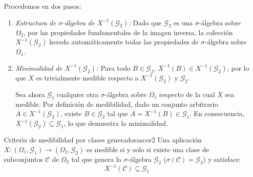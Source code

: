 \begin{demostracion}
Procedemos en dos pasos:
\begin{enumerate}[label=\arabic*.]
    \item \textit{Estructura de $\sigma$-álgebra de $X^{-1}(\mathcal{G}_2)$:}
    Dado que $\mathcal{G}_2$ es una $\sigma$-álgebra sobre $\Omega_2$, por las propiedades fundamentales de la imagen inversa, la colección $X^{-1}(\mathcal{G}_2)$ hereda automáticamente todas las propiedades de $\sigma$-álgebra sobre $\Omega_1$.
    
    \item \textit{Minimalidad de $X^{-1}(\mathcal{G}_2)$:}
    Para todo $B \in \mathcal{G}_2$, $X^{-1}(B) \in X^{-1}(\mathcal{G}_2)$, por lo que $X$ es trivialmente medible respecto a $X^{-1}(\mathcal{G}_2)$ y $\mathcal{G}_2$.
    
    Sea ahora $\mathcal{G}_1$ cualquier otra $\sigma$-álgebra sobre $\Omega_1$ respecto de la cual $X$ sea medible. Por definición de medibilidad, dado un conjunto arbitrario $A \in X^{-1}(\mathcal{G}_2)$, existe $B \in \mathcal{G}_2$ tal que $A = X^{-1}(B) \in \mathcal{G}_1$. En consecuencia, $X^{-1}(\mathcal{G}_2) \subseteq \mathcal{G}_1$, lo que demuestra la minimalidad.
\end{enumerate}
\end{demostracion}

\begin{corolario}{Criterio de medibilidad por clases generadoras}{cor2}
Una aplicación $X : (\Omega_1, \mathcal{G}_1) \to (\Omega_2, \mathcal{G}_2)$ es medible si y solo si existe una clase de subconjuntos $\mathcal{C}$ de $\Omega_2$ tal que genera la $\sigma$-álgebra $\mathcal{G}_2$ ($\sigma(\mathcal{C}) = \mathcal{G}_2$) y satisface:
\[
    X^{-1}(\mathcal{C}) \subseteq \mathcal{G}_1
\]
\end{corolario}

